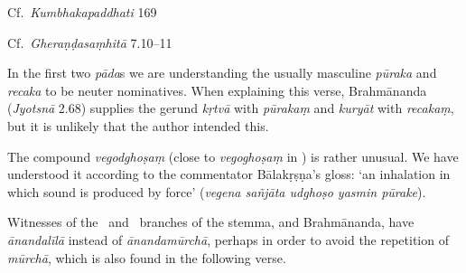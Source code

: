 \begin{ekdosis}
\begin{testimonia}[hp02_069]
Cf.~\emph{Kumbhakapaddhati} 169

\begin{versinnote}
\end{versinnote}

Cf.~\emph{Gheraṇḍasaṃhitā} 7.10--11

\begin{versinnote}
\end{versinnote}
\end{testimonia}

\begin{philcomm}[hp02_069]
In the first two \emph{pāda}s we are understanding the usually masculine \emph{pūraka} and \emph{recaka} to be neuter nominatives. When explaining this verse, Brahmānanda (\emph{Jyotsnā} 2.68) supplies the gerund \emph{kṛtvā} with \emph{pūrakaṃ} and \emph{kuryāt} with \emph{recakaṃ}, but it is unlikely that the author intended this. 

The compound \emph{vegodghoṣaṃ} (close to \emph{vegoghoṣaṃ} in \alphaOne) is rather unusual. We have understood it according to the commentator Bālakṛṣṇa’s gloss: `an inhalation in which sound is produced by force' (\emph{vegena sañjāta udghoṣo yasmin pūrake}).

Witnesses of the \gamma \ and \delta \ branches of the stemma, and Brahmānanda, have \emph{ānandalīlā} instead of \emph{ānandamūrchā}, perhaps in order to avoid the repetition of \emph{mūrchā}, which is also found in the following verse.

\end{philcomm}


\end{ekdosis}
